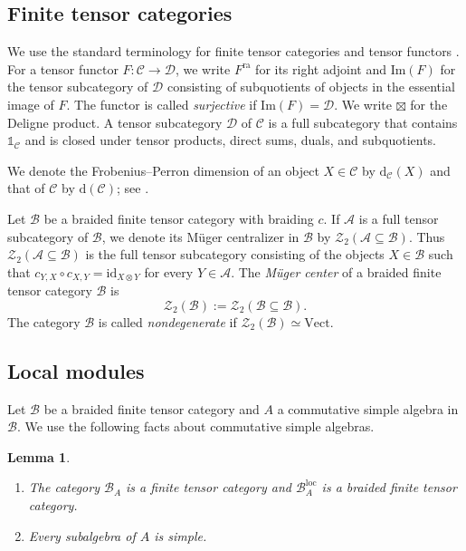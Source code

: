 \documentclass[11pt,reqno]{amsart}
\numberwithin{equation}{section}
\theoremstyle{plain}
\newtheorem{lemma}[thmctr]{Lemma}
\theoremstyle{definition}
\theoremstyle{remark}
\newcommand{\unit}{\mathds{1}}
\newcommand{\cA}{\mathcal{A}}
\newcommand{\B}{\mathcal{B}}
\newcommand{\C}{\mathcal{C}}
\newcommand{\D}{\mathcal{D}}
\newcommand{\Z}{\mathcal{Z}}
\newcommand{\loc}{\mathrm{loc}}
\newcommand{\ra}{\mathrm{ra}}
\newcommand{\im}{\mathrm{Im}}
\newcommand{\FP}{\mathrm{d}}
\newcommand{\Vect}{\mathrm{Vect}}
\newcommand{\id}{\mathrm{id}}
\begin{document}

\subsection{Finite tensor categories}

We use the standard terminology
for finite tensor categories and tensor functors \cite{etingof2016tensor}. For a tensor functor $F:\C\to\D$, we write
$F^{\ra}$ for its right adjoint and $\im(F)$ for the tensor subcategory of
$\D$ consisting of subquotients of objects in the essential image of $F$.
The functor is called \emph{surjective} if $\im(F) = \D$. We write
$\boxtimes$ for the Deligne product. A tensor subcategory $\D$ of $\C$
is a full subcategory that contains $\unit_\C$ and is closed under tensor
products, direct sums, duals, and subquotients.

We denote the Frobenius--Perron dimension of an object $X\in\C$ by
$\FP_{\C}(X)$ and that of $\C$ by $\FP(\C)$; see
\cite[Section~4]{etingof2016tensor}.


Let $\B$ be a braided finite tensor category with braiding $c$. 
If $\cA$ is a full tensor subcategory of $\B$, we denote its M\"uger
centralizer in $\B$ by $\Z_2(\cA\subseteq\B)$. 
Thus $\Z_2(\cA\subseteq\B)$ is the full tensor subcategory consisting of
the objects $X\in\B$ such that $c_{Y,X}\circ c_{X,Y}=\id_{X\otimes Y}$ 
for every $Y\in\cA$. The \emph{M\"uger center} of a braided finite tensor
category $\B$ is
\[
  \Z_2(\B):=\Z_2(\B\subseteq\B).
\]
The category $\B$ is called \emph{nondegenerate} if $\Z_2(\B)\simeq\Vect$.



\subsection{Local modules}
Let $\B$ be a braided finite tensor category and $A$ a commutative simple algebra in $\B$. We use the following facts about commutative simple algebras.

\begin{lemma}\label{lem:simple-commutative-module-categories}
\begin{enumerate}
  \item The category $\B_A$ is a finite tensor category and
  $\B_A^{\loc}$ is a braided finite tensor category.
  \item Every subalgebra of $A$ is simple.
\end{enumerate}
\end{lemma}
\end{document}
